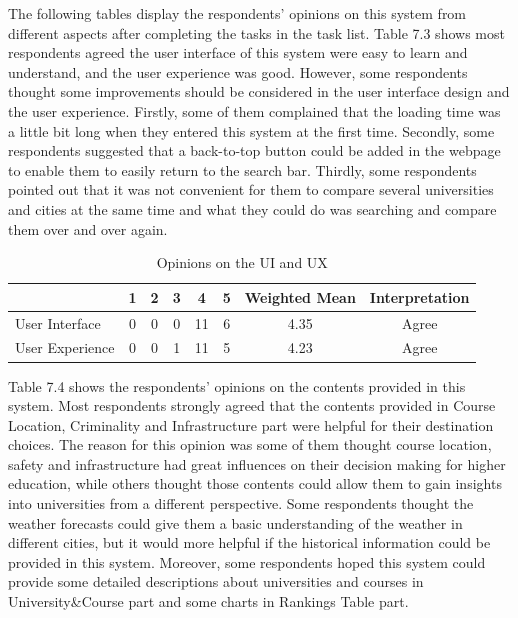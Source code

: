 The following tables display the respondents’ opinions on this system from different aspects after completing the tasks in the task list. Table 7.3 shows most respondents agreed the user interface of this system were easy to learn and understand, and the user experience was good. However, some respondents thought some improvements should be considered in the user interface design and the user experience. Firstly, some of them complained that the loading time was a little bit long when they entered this system at the first time. Secondly, some respondents suggested that a back-to-top button could be added in the webpage to enable them to easily return to the search bar. Thirdly, some respondents pointed out that it was not convenient for them to compare several universities and cities at the same time and what they could do was searching and compare them over and over again. 


\begin{table}[H]
\centering
\caption{Opinions on the UI and UX
}
\label{my-label}
\begin{tabular}{|p{4cm}|c|c|c|c|c|c|c|}
\hline
                & \textbf{1} & \textbf{2} & \textbf{3} & \textbf{4} & \textbf{5} & \textbf{Weighted Mean} & \textbf{Interpretation} \\ \hline
User Interface  & 0          & 0          & 0          & 11         & 6          & 4.35                   & Agree                   \\ \hline
User Experience & 0          & 0          & 1          & 11         & 5          & 4.23                   & Agree                   \\ \hline
\end{tabular}
\end{table}


Table 7.4 shows the respondents’ opinions on the contents provided in this system. Most respondents strongly agreed that the contents provided in Course Location, Criminality and Infrastructure part were helpful for their destination choices.  The reason for this opinion was some of them thought course location, safety and infrastructure had great influences on their decision making for higher education, while others thought those contents could allow them to gain insights into universities from a different perspective. Some respondents thought the weather forecasts could give them a basic understanding of the weather in different cities, but it would more helpful if the historical information could be provided in this system. Moreover, some respondents hoped this system could provide some detailed descriptions about universities and courses in University\&Course part and some charts in Rankings Table part.

